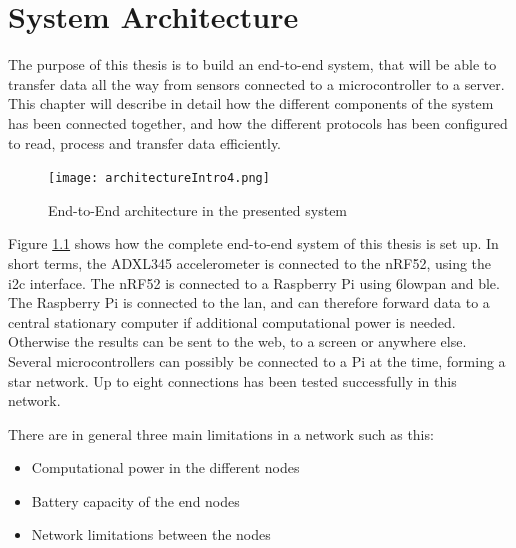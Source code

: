 \chapter{System Architecture}
\label{chp:architecture} 

\noindent The purpose of this thesis is to build an end-to-end system, that will be able to transfer data all the way from sensors connected to a \gls{microcontroller} to a server. This chapter will describe in detail how the different components of the system has been connected together, and how the different protocols has been configured to read, process and transfer data efficiently. 

\begin{figure}[ht]
    \centering
    \texttt{[image: architectureIntro4.png]}    
    \caption{End-to-End architecture in the presented system}
    \label{fig:systemArchitectureThisSystem}
\end{figure}


\noindent Figure \ref{fig:systemArchitectureThisSystem} shows how the complete end-to-end system of this thesis is set up. In short terms, the \gls{ADXL345} accelerometer is connected to the \gls{nRF52}, using the \gls{i2c} interface. The \gls{nRF52} is connected to a  \gls{Raspberry Pi} using \gls{6lowpan} and \gls{ble}. The \gls{Raspberry Pi} is connected to the \gls{lan}, and can therefore forward data to a central stationary computer if additional computational power is needed. Otherwise the results can be sent to the web, to a screen or anywhere else. Several \glspl{microcontroller} can possibly be connected to a Pi at the time, forming a star network. Up to eight connections has been tested successfully in this network. 
 
\noindent There are in general three main limitations in a network such as this:

\begin{itemize}
  \item Computational power in the different nodes
  \item Battery capacity of the end nodes
  \item Network limitations between the nodes
\end{itemize}


